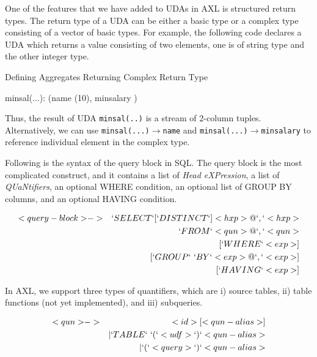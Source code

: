 One of the features that we have added to UDAs in AXL is structured
return types. The return type of a UDA can be either a basic type or a
complex type consisting of a vector of basic types.  For example, the
following code declares a UDA which returns a value consisting of two
elements, one is of string type and the other integer type.

\begin{example}{Defining Aggregates Returning Complex Return Type}
\begin{codedisplay}
\>\>\> minsal(...): (name (10), minsalary )
\end{codedisplay}
\label{exe:aggrcomplex}
\end{example}

Thus, the result of UDA {\tt minsal(..)} is a stream of 2-column
tuples.  Alternatively, we can use {\tt minsal(...)$\rightarrow$name}
and {\tt minsal(...)$\rightarrow$minsalary} to reference individual
element in the complex type. 


Following is the syntax of the query block in SQL. The query block is
the most complicated construct, and it contains a list of {\it Head
  eXPression}, a list of {\it QUaNtifiers}, an optional WHERE
condition, an optional list of GROUP BY columns, and an optional
HAVING condition.

\begin{bnf}
  \begin{eqnarray*}
    <query-block> &->& `SELECT` [`DISTINCT`] <hxp> {@ `,` <hxp>} \\
    && `FROM` <qun> {@ `,` <qun>} \\
    && [`WHERE` <exp>] \\
    && [`GROUP` \ `BY` <exp> {@ `,` <exp>}] \\
    && [`HAVING` <exp>]\\
  \end{eqnarray*}
\end{bnf}

In AXL, we support three types of quantifiers, which are i) source
tables, ii) table functions (not yet implemented), and iii)
subqueries.

\begin{bnf}
  \begin{eqnarray*}
    <qun>  &->& <id> [<qun-alias>] \\
    && | `TABLE` \ `(` <udf> `)` <qun-alias>\\
    && | `(` <query> `)` <qun-alias>
  \end{eqnarray*}
\end{bnf}


